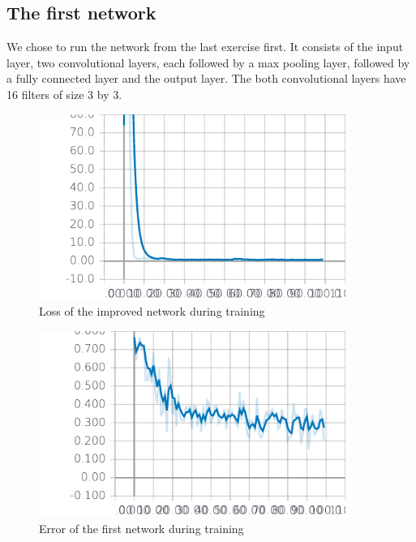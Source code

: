 \documentclass[
        a4paper,
        10pt,
        parskip = full,    %
    ]{scrartcl}
\begin{document}
\subsection{The first network}
We chose to run the network from the last exercise first.
It consists of the input layer, two convolutional layers, each followed by a max pooling layer, followed by a fully connected layer and the output layer. The both convolutional layers have 16 filters of size 3 by 3.

\begin{figure}[H]
  \begin{center}
    \includegraphics[width=10cm]{../images/loss.pdf}
    \caption{Loss of the improved network during training}
    \label{Learning measurements}
  \end{center}
\end{figure}

\begin{figure}[H]
  \begin{center}
    \includegraphics[width=10cm]{../images/train_error.pdf}
    \caption{Error of the first network during training}
    \label{Learning measurements}
  \end{center}
\end{figure}
\end{document}

